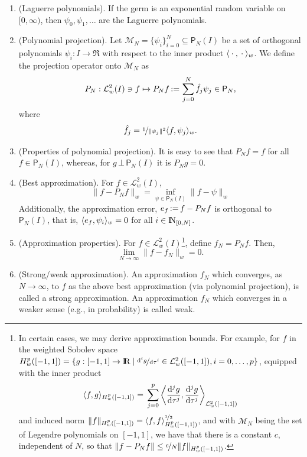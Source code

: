 \documentclass[a4paper,10pt]{scrbook}
\begin{document}
\begin{enumerate}
 \item (Laguerre polynomials). If the germ is an exponential random variable on \([0,\infty)\),
       then \(\psi_0,\psi_1,\ldots\) are the Laguerre polynomials.
       
 \item (Polynomial projection). Let \(\mathcal{M}_N = \{\psi_i\}_{i=0}^{N} \subseteq \mathsf{P}_N(I)\) be a set of orthogonal polynomials
       \(\psi_i:I\to\Re\) with respect to the inner product \(\langle{}\cdot{}, {}\cdot{}\rangle_w\).
       We define the projection operator onto \(\mathcal{M}_N\) as
       \[
        P_N:\mathcal{L}^2_w(I) \ni f \mapsto P_N f {}\mathop{\mathrel{:}=}{} \sum_{j=0}^{N}\hat{f}_j \psi_j \in \mathsf{P}_N,
       \]
       where 
       \[
	 \hat{f}_j = \nicefrac{1}{\|\psi_j\|^2}\langle f, \psi_j\rangle_w.
       \]
 \item (Properties of polynomial projection). It is easy to see that \(P_N f = f\) for all \(f\in\mathsf{P}_N(I)\),
       whereas, for \(g {}{\,}\bot{\,}{} \mathsf{P}_N(I)\) it is \(P_N g = 0\).

 \item (Best approximation). For \(f\in\mathcal{L}^2_w(I)\),        
       \[
        \|f - P_N f \|_{w} = \inf_{\psi\in\mathsf{P}_N(I)}\|f - \psi\|_{w} 
       \]
       Additionally, the approximation error, \(e_f {}\mathop{\mathrel{:}=}{} f - P_Nf\) is orthogonal to \(\mathsf{P}_N(I)\), 
       that is, \(\langle e_f, \psi_i\rangle_w = 0\) for all \(i\in\N_{[0,N]}\).

 \item (Approximation properties). For  \(f\in\mathcal{L}^2_w(I)\)\footnote{In certain cases, we may derive approximation 
       bounds. For example, for \(f\) in the weighted Sobolev space 
	    \(
		H_{w}^p([-1,1])
		{}={}
		\{
		  g: [-1,1]\to\Re 
		  {}\mid{}
		  \nicefrac{\d^i g}{\d \tau^i} \in \mathcal{L}^2_w([-1,1]),
		  i=0,\ldots,p
		\}
	    \),
	    equipped with the inner product 
	    \[
		\langle f,g\rangle_{H_{w}^p([-1,1])} 
		{}={}
		\sum_{j=0}^{p}
		\left\langle
		  \frac{\mathrm{d}^j g}{\mathrm{d} \tau^j},
		  \frac{\mathrm{d}^j g}{\mathrm{d} \tau^j}
		\right\rangle_{\mathcal{L}_w^2([-1,1])}
	    \]
	    and induced norm \(\|f\|_{H_{w}^p([-1,1])} = \langle f,f\rangle_{H_{w}^p([-1,1])}^{\nicefrac{1}{2}}\),
	    and with \(\mathcal{M}_N\) being the set of Legendre polynomials on \([-1,1]\),
	    we have that there is a constant \(c\), independent of \(N\), so that \(\|f-P_Nf\| \leq \nicefrac{c}{N}\|f\|_{H_{w}^p([-1,1])}\).
	    }, define \(f_N = P_N f\). Then,
	\[
	  \lim_{N\to\infty}\|f - f_N\|_{w} = 0.
	\]
 \item (Strong/weak approximation). An approximation \(f_N\) which converges, as \(N\to\infty\), to \(f\) as the 
       above best approximation (via polynomial projection), is called a strong approximation. An approximation
       \(f_N\) which converges in a weaker sense (e.g., in probability) is called weak.
\end{enumerate}
\end{document}
